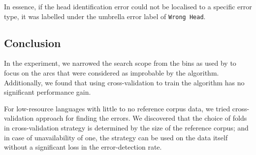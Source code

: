 In essence, if the head identification error could not be localised to a specific error type, it was labelled under the umbrella error label of \texttt{Wrong Head}.

\subsection{Conclusion}

In the experiment, we narrowed the search scope from the bins as used by \cite{alzetta2017dangerous} to focus on the arcs that were considered as improbable by the algorithm. Additionally, we found that using cross-validation to train the algorithm has no significant performance gain.

For low-resource languages with little to no reference corpus data, we tried cross-validation approach for finding the errors. We discovered that the choice of folds in cross-validation strategy is determined by the size of the reference corpus; and in case of unavailability of one, the strategy can be used on the data itself without a significant loss in the error-detection rate. 